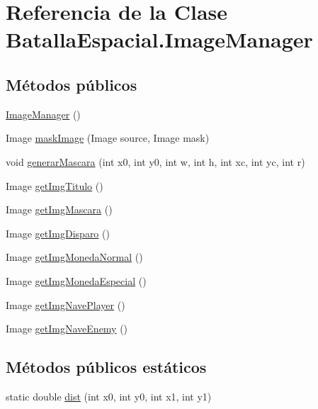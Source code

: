 \hypertarget{classBatallaEspacial_1_1ImageManager}{
\section{Referencia de la Clase BatallaEspacial.ImageManager}
\label{classBatallaEspacial_1_1ImageManager}
}
\subsection*{Métodos públicos}
\begin{DoxyCompactItemize}
\item 
\hyperlink{classBatallaEspacial_1_1ImageManager_a408a6f40a523d61968a11bef650993e9}{ImageManager} ()
\item 
Image \hyperlink{classBatallaEspacial_1_1ImageManager_a24d3827497b8a99220be6dd46d4a8043}{maskImage} (Image source, Image mask)
\item 
void \hyperlink{classBatallaEspacial_1_1ImageManager_ac6a3c376b12cca2154d3ca20f76c535c}{generarMascara} (int x0, int y0, int w, int h, int xc, int yc, int r)
\item 
Image \hyperlink{classBatallaEspacial_1_1ImageManager_a22a45f90bf2c2aa015685eefe44fc7cb}{getImgTitulo} ()
\item 
Image \hyperlink{classBatallaEspacial_1_1ImageManager_adb5661a7e0ee08d91851e4dcbcfe8f9d}{getImgMascara} ()
\item 
Image \hyperlink{classBatallaEspacial_1_1ImageManager_ac2e8ccfdcc24fc0b1edbe86629be4360}{getImgDisparo} ()
\item 
Image \hyperlink{classBatallaEspacial_1_1ImageManager_a0df06053e8ca78c3e64ae2f728dbd507}{getImgMonedaNormal} ()
\item 
Image \hyperlink{classBatallaEspacial_1_1ImageManager_aa2929b448f059b3e1f245b21af07d80e}{getImgMonedaEspecial} ()
\item 
Image \hyperlink{classBatallaEspacial_1_1ImageManager_abe268a56366974ff2339179099850285}{getImgNavePlayer} ()
\item 
Image \hyperlink{classBatallaEspacial_1_1ImageManager_a70f2abdf9b2e958f3d9b0fbfeb9dbfe0}{getImgNaveEnemy} ()
\end{DoxyCompactItemize}
\subsection*{Métodos públicos estáticos}
\begin{DoxyCompactItemize}
\item 
static double \hyperlink{classBatallaEspacial_1_1ImageManager_ac102dabc6dd25bdbe4a0bd9d6289676c}{dist} (int x0, int y0, int x1, int y1)
\end{DoxyCompactItemize}
